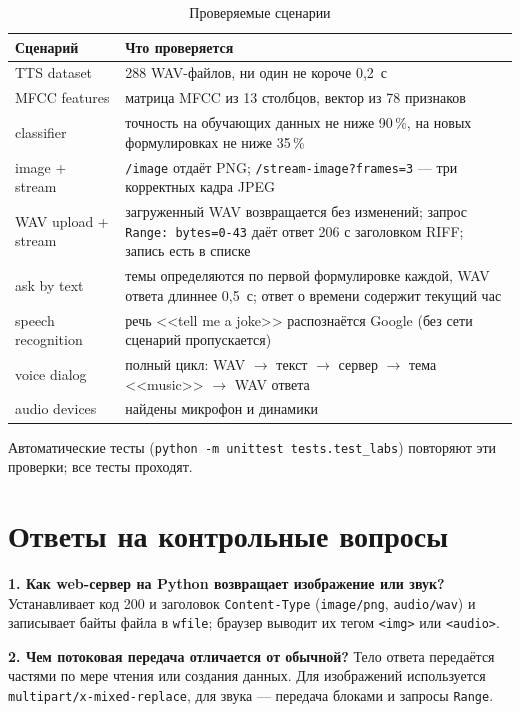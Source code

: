 \documentclass[14pt,a4paper]{extarticle}
\begin{document}


\begin{table}[H]
\caption{Проверяемые сценарии}
\label{tab:results}
\centering
\small
\begin{tabularx}{\textwidth}{lL}
\toprule
Сценарий & Что проверяется \\
\midrule
TTS dataset & 288 WAV-файлов, ни один не короче 0,2~с \\
MFCC features & матрица MFCC из 13 столбцов, вектор из 78 признаков \\
classifier & точность на обучающих данных не ниже 90\,\%, на новых формулировках не
ниже 35\,\% \\
image + stream & \texttt{/image} отдаёт PNG; \texttt{/stream-image?frames=3} --- три
корректных кадра JPEG \\
WAV upload + stream & загруженный WAV возвращается без изменений; запрос
\texttt{Range: bytes=0-43} даёт ответ 206 с заголовком RIFF; запись есть в списке \\
ask by text & темы определяются по первой формулировке каждой, WAV ответа длиннее
0,5~с; ответ о времени содержит текущий час \\
speech recognition & речь <<tell me a joke>> распознаётся Google (без сети сценарий
пропускается) \\
voice dialog & полный цикл: WAV $\to$ текст $\to$ сервер $\to$ тема <<music>> $\to$
WAV ответа \\
audio devices & найдены микрофон и динамики \\
\bottomrule
\end{tabularx}
\end{table}

Автоматические тесты (\texttt{python -m unittest tests.test\_labs}) повторяют эти
проверки; все тесты проходят.

\section{Ответы на контрольные вопросы}

\textbf{1. Как web-сервер на Python возвращает изображение или звук?} Устанавливает
код 200 и заголовок \texttt{Content-Type} (\texttt{image/png}, \texttt{audio/wav}) и
записывает байты файла в \texttt{wfile}; браузер выводит их тегом \texttt{<img>} или
\texttt{<audio>}.

\textbf{2. Чем потоковая передача отличается от обычной?} Тело ответа передаётся
частями по мере чтения или создания данных. Для изображений используется
\texttt{multipart/x-mixed-replace}, для звука --- передача блоками и запросы
\texttt{Range}.
\end{document}
